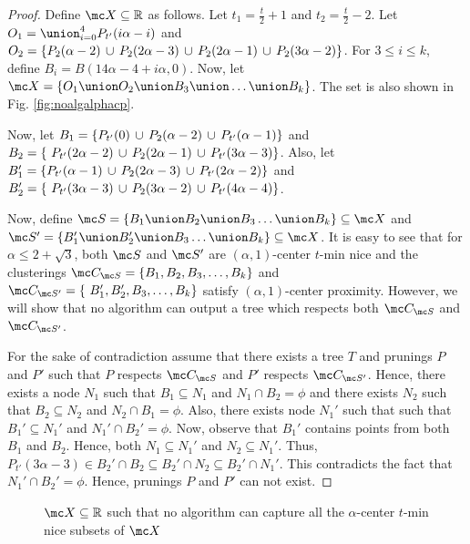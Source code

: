 \documentclass[11pt]{article}
\begin{document}
\begin{proof}
Define $\mc X \subseteq \mathbb{R}$ as follows. Let $t_1 = \frac{t}{2}+1$ and $t_2 = \frac{t}{2}-2$. Let $O_1 = \union_{i=0}^4 P_{t'}(i\alpha-i)$ and $O_2 = \{P_{2}(\alpha-2) \thinspace\cup\thinspace P_{2}(2\alpha-3) \thinspace\cup\thinspace P_{2}(2\alpha-1) \thinspace\cup\thinspace P_{2}(3\alpha-2)\}$. For $3\le i\le k$, define $B_i = B(14\alpha-4+i\alpha, 0)$. Now, let $\mc X = \{O_1 \union O_2 \union B_3 \union \ldots \union B_k\}$. The set is also shown in Fig. \ref{fig:noalgalphacp}.

Now, let $B_1 = \{P_{t'}(0) \thinspace\cup\thinspace  P_{2}(\alpha-2) \thinspace\cup\thinspace P_{t'}(\alpha-1) \}$ and $B_2 = \{\ P_{t'}(2\alpha-2) \thinspace\cup\thinspace P_{2}(2\alpha-1)\thinspace\cup\thinspace P_{t'}(3\alpha-3)\}$. Also, let $B_1' = \{P_{t'}(\alpha-1) \thinspace\cup\thinspace  P_{2}(2\alpha-3) \thinspace\cup\thinspace P_{t'}(2\alpha-2) \}$ and $B_2' = \{\ P_{t'}(3\alpha-3) \thinspace\cup\thinspace P_{2}(3\alpha-2)\thinspace\cup\thinspace P_{t'}(4\alpha-4)\}$. 

Now, define $\mc S = \{B_1 \union B_2 \union B_3\ldots \union B_k\} \subseteq \mc X$ and $\mc S' = \{B_1' \union B_2' \union B_3\ldots \union B_k\} \subseteq \mc X$. It is easy to see that for $\alpha \le 2+\sqrt{3}$, both $\mc S$ and $\mc S'$ are $(\alpha, 1)$-center $t$-min nice and the clusterings $\mc C_{\mc S} = \{B_1, B_2, B_3, \ldots, B_k\}$ and $\mc C_{\mc S'} = \{\ B_1', B_2', B_3, \ldots, B_k\}$ satisfy $(\alpha, 1)$-center proximity. However, we will show that no algorithm can output a tree which respects both $\mc C_{\mc S}$ and $\mc C_{\mc S'}$.

For the sake of contradiction assume that there exists a tree $T$ and prunings $P$ and $P'$ such that $P$ respects $\mc C_{\mc S}$ and $P'$ respects $\mc C_{\mc S'}$. Hence, there exists a node $N_1$ such that $B_1 \subseteq N_1$ and $N_1 \cap B_2 = \phi$ and there exists $N_2$ such that $B_2 \subseteq N_2$ and $N_2 \cap B_1 = \phi$. Also, there exists node $N_1'$ such that such that $B_1' \subseteq N_1'$ and $N_1' \cap B_2' = \phi$. Now, observe that $B_1'$ contains points from both $B_1$ and $B_2$. Hence, both $N_1 \subseteq N_1'$ and $N_2 \subseteq N_1'$. Thus, $P_{t'}(3\alpha-3)\in B_2'\cap B_2 \subseteq B_2' \cap N_2 \subseteq B_2' \cap N_1'$. This contradicts the fact that $N_1' \cap B_2' = \phi$. Hence, prunings $P$ and $P'$ can not exist.
\end{proof}

\begin{figure}[!ht]

\caption{$\mc X \subseteq \mathbb{R}$ such that no algorithm can capture all the $\alpha$-center $t$-min nice subsets of $\mc X$}
\label{fig:nosparsealg}
\end{figure}
\end{document}
